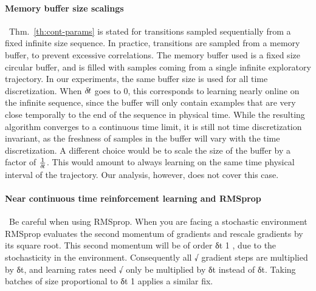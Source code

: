 \paragraph{Memory buffer size scalings}~Thm.~\ref{th:cont-params} is stated for
transitions sampled sequentially from a fixed infinite size sequence. In practice,
transitions are sampled from a memory buffer, to prevent excessive correlations.
The memory buffer used is a fixed size circular buffer, and is
filled with samples coming from a single infinite exploratory trajectory. In
our experiments, the same buffer size is used for all time discretization. When
${\delta\hspace{-.1em}t}$ goes to $0$, this corresponds to learning nearly online on the
infinite sequence, since the buffer will only contain examples that are very
close temporally to the end of the sequence in physical time. While the resulting
algorithm  converges to a continuous time limit, it is still not
time discretization invariant, as the freshness of samples in the buffer will
vary with the time discretization.
A different choice would be to scale the size of the buffer by a factor of
$\frac{1}{{\delta\hspace{-.1em}t}}$. This would amount to always learning on the same time physical interval of
the trajectory. Our analysis, however, does not cover this case.

\paragraph{Near continuous time reinforcement learning and RMSprop}~Be careful
when using RMSprop. When you are facing a stochastic environment RMSprop
evaluates the second momentum of gradients and rescale gradients by its square
root. This second momentum will be of order δt 1 , due to the stochasticity in
the environment.  Consequently all √ gradient steps are multiplied by δt, and
learning rates need √ only be multiplied by δt instead of δt. Taking batches of
size proportional to δt 1 applies a similar fix.
